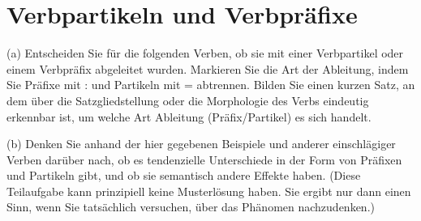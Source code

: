 
\section{Verbpartikeln und Verbpräfixe}

(a) Entscheiden Sie für die folgenden Verben, ob sie mit einer Verbpartikel oder einem Verbpräfix abgeleitet wurden.
Markieren Sie die Art der Ableitung, indem Sie Präfixe mit : und Partikeln mit = abtrennen.
Bilden Sie einen kurzen Satz, an dem über die Satzgliedstellung oder die Morphologie des Verbs eindeutig erkennbar ist, um welche Art Ableitung (Präfix\slash Partikel) es sich handelt.

(b) Denken Sie anhand der hier gegebenen Beispiele und anderer einschlägiger Verben darüber nach, ob es tendenzielle Unterschiede in der Form von Präfixen und Partikeln gibt, und ob sie semantisch andere Effekte haben.
(Diese Teilaufgabe kann prinzipiell keine Musterlösung haben.
Sie ergibt nur dann einen Sinn, wenn Sie tatsächlich versuchen, über das Phänomen nachzudenken.)

